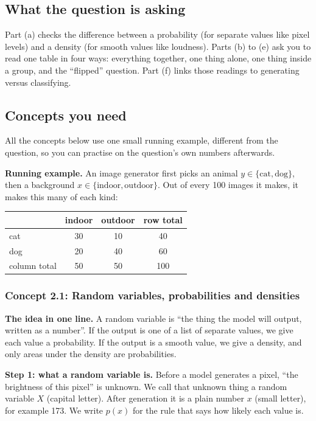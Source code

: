 \documentclass[12pt,a4paper]{article}
\begin{document}
\subsection{What the question is asking}

Part (a) checks the difference between a probability (for separate values like pixel levels) and a density (for smooth values like loudness). Parts (b) to (e) ask you to read one table in four ways: everything together, one thing alone, one thing inside a group, and the ``flipped'' question. Part (f) links those readings to generating versus classifying.

\subsection{Concepts you need}

All the concepts below use one small running example, different from the question, so you can practise on the question's own numbers afterwards.

\textbf{Running example.} An image generator first picks an animal $y\in\{\text{cat},\text{dog}\}$, then a background $x\in\{\text{indoor},\text{outdoor}\}$. Out of every 100 images it makes, it makes this many of each kind:
\begin{center}
\begin{tabular}{@{}lccc@{}}
\toprule
 & indoor & outdoor & row total \\
\midrule
cat & 30 & 10 & 40 \\
dog & 20 & 40 & 60 \\
\midrule
column total & 50 & 50 & 100 \\
\bottomrule
\end{tabular}
\end{center}

\subsubsection{Concept 2.1: Random variables, probabilities and densities}\label{c2-1}

\textbf{The idea in one line.} A random variable is ``the thing the model will output, written as a number''. If the output is one of a list of separate values, we give each value a probability. If the output is a smooth value, we give a density, and only areas under the density are probabilities.

\textbf{Step 1: what a random variable is.} Before a model generates a pixel, ``the brightness of this pixel'' is unknown. We call that unknown thing a random variable $X$ (capital letter). After generation it is a plain number $x$ (small letter), for example 173. We write $p(x)$ for the rule that says how likely each value is.
\end{document}
